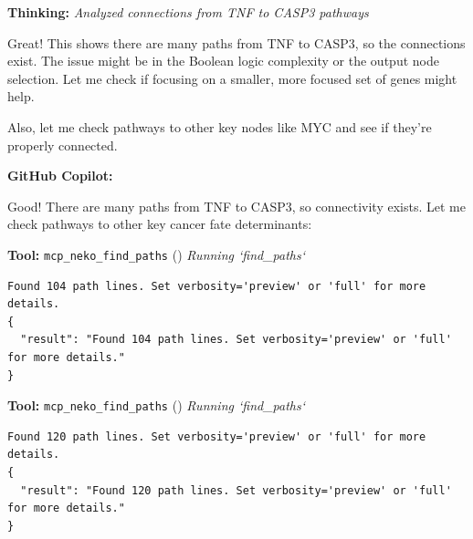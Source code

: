 \documentclass[11pt,a4paper]{article}
\begin{document}
\begin{thinkbox}
\textbf{Thinking:} \textit{Analyzed connections from TNF to CASP3 pathways}

Great! This shows there are many paths from TNF to CASP3, so the connections exist. The issue might be in the Boolean logic complexity or the output node selection. Let me check if focusing on a smaller, more focused set of genes might help.

Also, let me check pathways to other key nodes like MYC and see if they're properly connected.

\end{thinkbox}
\begin{copilotbox}
\textbf{GitHub Copilot:}

Good! There are many paths from TNF to CASP3, so connectivity exists. Let me check pathways to other key cancer fate determinants:

\end{copilotbox}
\begin{toolokbox}
\textbf{Tool:} \texttt{mcp\_neko\_find\_paths} (\checkmark)
\textit{Running `find\_paths`}
\begin{lstlisting}
Found 104 path lines. Set verbosity='preview' or 'full' for more details.
{
  "result": "Found 104 path lines. Set verbosity='preview' or 'full' for more details."
}
\end{lstlisting}
\end{toolokbox}
\begin{toolokbox}
\textbf{Tool:} \texttt{mcp\_neko\_find\_paths} (\checkmark)
\textit{Running `find\_paths`}
\begin{lstlisting}
Found 120 path lines. Set verbosity='preview' or 'full' for more details.
{
  "result": "Found 120 path lines. Set verbosity='preview' or 'full' for more details."
}
\end{lstlisting}
\end{toolokbox}
\end{document}
